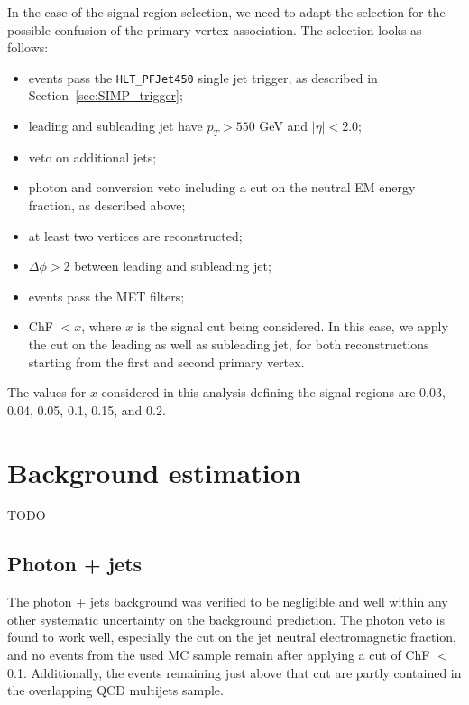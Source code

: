 In the case of the signal region selection, we need to adapt the selection for the possible confusion of the primary vertex association. The selection looks as follows:

\begin{itemize}
 \item events pass the \texttt{HLT\_PFJet450} single jet trigger, as described in Section~\ref{sec:SIMP_trigger};
 \item leading and subleading jet have $p_T > 550$ GeV and $|\eta| < 2.0$;
 \item veto on additional jets;
 \item photon and conversion veto including a cut on the neutral EM energy fraction, as described above;
 \item at least two vertices are reconstructed;
 \item $\Delta\phi > 2$ between leading and subleading jet;
 \item events pass the MET filters;
 \item ChF $< x$, where $x$ is the signal cut being considered. In this case, we apply the cut on the leading as well as subleading jet, for both reconstructions starting from the first and second primary vertex.
\end{itemize}

The values for $x$ considered in this analysis defining the signal regions are 0.03, 0.04, 0.05, 0.1, 0.15, and 0.2. 

\section{Background estimation}
\hspace{1cm}
{\color{red} TODO}

\subsection{Photon + jets}

The photon + jets background was verified to be negligible and well within any other systematic uncertainty on the background prediction. The photon veto is found to work well, especially the cut on the jet neutral electromagnetic fraction, and no events from the used MC sample remain after applying a cut of ChF $<$ 0.1. Additionally, the events remaining just above that cut are partly contained in the overlapping QCD multijets sample.

